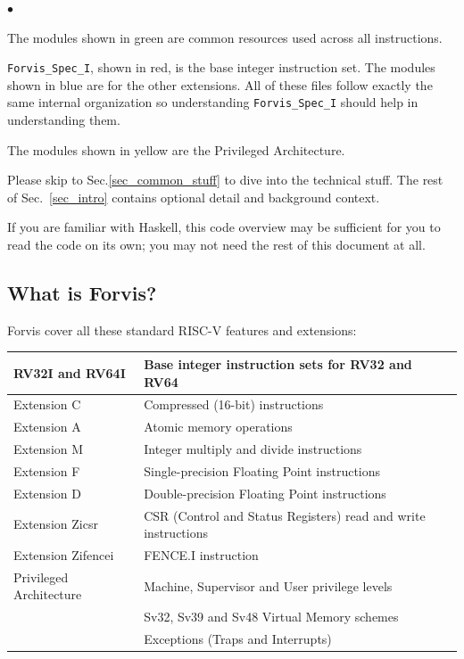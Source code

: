 \documentclass[11pt]{article}
\newenvironment{tightlist}%
{\begin{list}{$\bullet$}{%
    \setlength{\topsep}{0in}
    \setlength{\partopsep}{0in}
    \setlength{\itemsep}{0in}
    \setlength{\parsep}{0in}
    \setlength{\leftmargin}{1.5em}
    \setlength{\rightmargin}{0in}
    \setlength{\itemindent}{0in}
}
}%
{\end{list}
}
\begin{document}
\begin{tightlist}

\item The modules shown in green are common resources used across all instructions.

\item \verb|Forvis_Spec_I|, shown in red, is the base integer
instruction set.  The modules shown in blue are for the other
extensions. All of these files follow exactly the same internal
organization so understanding \verb|Forvis_Spec_I| should help in
understanding them.

\item The modules shown in yellow are the Privileged Architecture.

\end{tightlist}

Please skip to Sec.\ref{sec_common_stuff} to dive into the technical
stuff.  The rest of Sec.~\ref{sec_intro} contains optional detail and
background context.

If you are familiar with Haskell, this code overview may be sufficient
for you to read the code on its own; you may not need the rest of this
document at all.


\subsection{What is Forvis?}

Forvis cover all these standard RISC-V features and extensions:

\begin{center}
\begin{tabular}{|l|l|}
\hline
RV32I and RV64I  & Base integer instruction sets for RV32 and RV64 \\
\hline
Extension C      & Compressed (16-bit) instructions \\
\hline
Extension A      & Atomic memory operations \\
\hline
Extension M      & Integer multiply and divide instructions \\
\hline
Extension F      & Single-precision Floating Point instructions \\
\hline
Extension D      & Double-precision Floating Point instructions \\
\hline
Extension Zicsr  & CSR (Control and Status Registers) read and write instructions\\
\hline
Extension Zifencei  & FENCE.I instruction \\
\hline
Privileged Architecture  & Machine, Supervisor and User privilege levels \\
                         & Sv32, Sv39 and Sv48 Virtual Memory schemes \\
			 & Exceptions (Traps and Interrupts) \\
\hline
\end{tabular}
\end{center}
\end{document}
